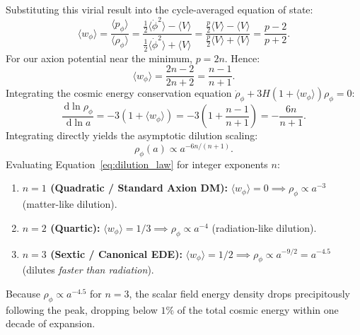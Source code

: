 \documentclass[11pt]{article}
\newcommand{\dd}{\,\mathrm d}
\begin{document}
Substituting this virial result into the cycle-averaged equation of state:
\begin{equation}
\langle w_\phi \rangle = \frac{\langle p_\phi \rangle}{\langle \rho_\phi \rangle} = \frac{\frac{1}{2}\langle \dot\phi^2 \rangle - \langle V \rangle}{\frac{1}{2}\langle \dot\phi^2 \rangle + \langle V \rangle} = \frac{\frac{p}{2}\langle V \rangle - \langle V \rangle}{\frac{p}{2}\langle V \rangle + \langle V \rangle} = \frac{p - 2}{p + 2}.
\end{equation}
For our axion potential near the minimum, $p = 2n$. Hence:
\begin{equation}
\boxed{\langle w_\phi \rangle = \frac{2n - 2}{2n + 2} = \frac{n - 1}{n + 1}}.
\label{eq:w_averaged}
\end{equation}
Integrating the cosmic energy conservation equation $\dot\rho_\phi + 3H(1 + \langle w_\phi \rangle)\rho_\phi = 0$:
\begin{equation}
\frac{\dd\ln\rho_\phi}{\dd\ln a} = -3(1 + \langle w_\phi \rangle) = -3\left(1 + \frac{n - 1}{n + 1}\right) = -\frac{6n}{n + 1}.
\end{equation}
Integrating directly yields the asymptotic dilution scaling:
\begin{equation}
\boxed{\rho_\phi(a) \propto a^{-6n/(n+1)}}.
\label{eq:dilution_law}
\end{equation}
Evaluating Equation~\eqref{eq:dilution_law} for integer exponents $n$:
\begin{enumerate}
\item \textbf{$n = 1$ (Quadratic / Standard Axion DM):} $\langle w_\phi \rangle = 0 \implies \rho_\phi \propto a^{-3}$ (matter-like dilution).
\item \textbf{$n = 2$ (Quartic):} $\langle w_\phi \rangle = 1/3 \implies \rho_\phi \propto a^{-4}$ (radiation-like dilution).
\item \textbf{$n = 3$ (Sextic / Canonical EDE):} $\langle w_\phi \rangle = 1/2 \implies \rho_\phi \propto a^{-9/2} = a^{-4.5}$ (dilutes \emph{faster than radiation}).
\end{enumerate}
Because $\rho_\phi \propto a^{-4.5}$ for $n=3$, the scalar field energy density drops precipitously following the peak, dropping below $1\%$ of the total cosmic energy within one decade of expansion.
\end{document}
